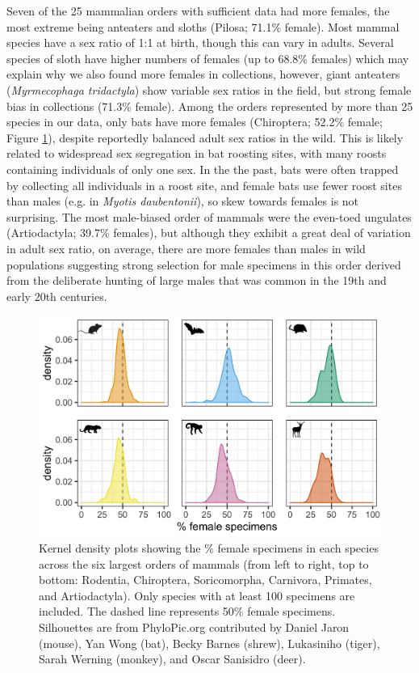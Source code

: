 \documentclass[a4paper, 12pt]{article}
\begin{document}
Seven of the 25 mammalian orders with sufficient data had more females, the most extreme being anteaters and sloths (Pilosa; 71.1\% female). 
Most mammal species have a sex ratio of 1:1 at birth\cite{karlin1986theoretical}, though this can vary in adults. 
Several species of sloth have higher numbers of females (up to 68.8\% females\cite{reyes2015informacion}) which may explain why we also found more females in collections, however, giant anteaters (\textit{Myrmecophaga tridactyla}) show variable sex ratios in the field\cite{anteater2005}, but strong female bias in collections (71.3\% female). 
Among the orders represented by more than 25 species in our data, only bats have more females (Chiroptera; 52.2\% female; Figure \ref{fig-mammal_order_six}), despite reportedly balanced adult sex ratios in the wild\cite{altringham}. 
This is likely related to widespread sex segregation in bat roosting sites, with many roosts containing individuals of only one sex\cite{altringham}. 
In the the past, bats were often trapped by collecting all individuals in a roost site, and female bats use fewer roost sites than males (e.g. in \textit{Myotis daubentonii}\cite{encarnaccao2012spatiotemporal}), so skew towards females is not surprising. 
The most male-biased order of mammals were the even-toed ungulates (Artiodactyla; 39.7\% females), but although they exhibit a great deal of variation in adult sex ratio, on average, there are more females than males in wild populations\cite{berger1999sex} suggesting strong selection for male specimens in this order derived from the deliberate hunting of large males that was common in the 19th and early 20th centuries.

\begin{figure}
 \centering
  \includegraphics[width = \linewidth]{figures/orders-density-mammals-six.png}
  \caption{Kernel density plots showing the \% female specimens in each species across the six largest orders of mammals (from left to right, top to bottom: Rodentia, Chiroptera, Soricomorpha, Carnivora, Primates, and Artiodactyla). 
  Only species with at least 100 specimens are included. 
  The dashed line represents 50\% female specimens. 
  Silhouettes are from PhyloPic.org contributed by Daniel Jaron (mouse), Yan Wong (bat), Becky Barnes (shrew), Lukasiniho (tiger), Sarah Werning (monkey), and Oscar Sanisidro (deer).
}
  \label{fig-mammal_order_six}
\end{figure}
\end{document}
